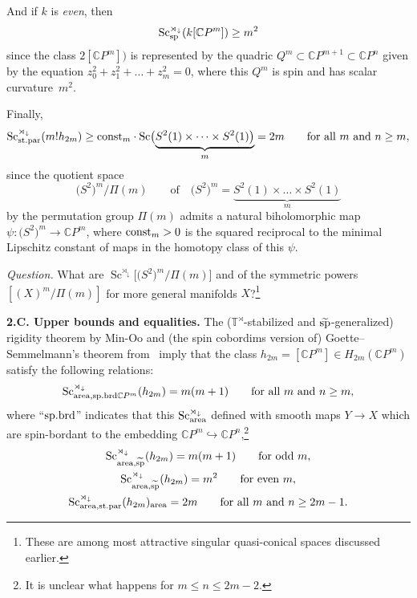 \documentclass[10pt,a4paper]{amsart}
\numberwithin{equation}{section}
\begin{document}
And if $k$ is {\it even}, then
\[
\operatorname{Sc}_{\rm sp}^{\rtimes_\downarrow}(k[\mathbb CP^m])\geq m^2
\]
since the class
$2[\mathbb CP^m])$ is represented by the
 quadric $Q^m\subset \mathbb CP^{m+1}\subset \mathbb CP^n$ given by the equation $z_0^2+z_1^2+\dots +z_m^2=0$,
 where this
$Q^m$ is spin and has scalar curvature~$m^2$.

Finally,
\[
\operatorname{Sc}_{\rm st.par}^{\rtimes_\downarrow}(m!h_{2m}) \geq {\rm const}_m \cdot \operatorname{Sc}\bigl(\underset {m} {\underbrace { S^2(1)\times \dots \times S^2(1)\bigr)}}=2m
\qquad \mbox{for all $m$ and $n\geq m$},
\]
since the quotient space
\[
\bigl(S^2\bigr)^m/\Pi(m) \qquad \text{of} \quad \bigl(S^2\bigr)^m=\underset {m} {\underbrace { S^2(1)\times \dots \times S^2(1)}}
\]
 by the permutation group $\Pi(m)$ admits a natural biholomorphic map $\psi\colon \bigl(S^2\bigr)^m\to \mathbb CP^m$,
 where ${\rm const}_m>0$ is the squared reciprocal to the minimal Lipschitz constant of
 maps in the homotopy class of this $\psi$.

 {\it Question.} What are $\operatorname{Sc}^{\rtimes_\downarrow}\bigl[\bigl(S^2\bigr)^m/\Pi(m)\bigr]$
 and of the symmetric powers $[(X)^m/\Pi(m)]$ for more general manifolds $X$?\footnote{These are among most attractive singular quasi-conical spaces discussed earlier.}

\textbf{2.C. Upper bounds and equalities.} The ($\mathbb T^\rtimes$-stabilized and $\widetilde{\rm sp}$-generalized) rigidity theorem by
Min-Oo \cite{Mi1995} and (the spin cobordims version of) Goette--Semmelmann's theorem from~\cite{GS1999} imply that the
class $h_{2m} =[\mathbb CP^m]\in H_{2m}(\mathbb CP^m)$ satisfy the following relations:
\begin{gather*}
\operatorname{Sc}_{{\rm area,sp.brd}\mathbb C P^m}^{\rtimes_\downarrow} (h_{2m})= m(m+1) \qquad \text{for all $m$ and $n\geq m$}, %
\end{gather*}
 where ``${\rm sp.brd}$'' indicates that this $\operatorname{Sc}_{\rm area}^{\rtimes_\downarrow}$ defined with smooth maps $Y\to X$ which are spin-bordant to the embedding $\mathbb CP^{m}\hookrightarrow \mathbb CP^{n}$,\footnote{It is unclear what happens for $m \leq n\leq 2m-2$.}
\begin{gather*}
\operatorname{Sc}_{{\rm area},\widetilde{\rm sp}}^{\rtimes_\downarrow} (h_{2m})= m(m+1) \qquad \text{for odd $m$},  %
\\
\operatorname{Sc}^{\rtimes_\downarrow} _{{\rm area},\widetilde {\rm sp}}(h_{2m})=m^2 \qquad \text{for even $m$}, %
\\
\operatorname{Sc}^{\rtimes_\downarrow} _{{\rm area,st.par}}(h_{2m})_{\rm area} =2m \qquad \text{for all $m$ and $n\geq 2m-1$}. %
\end{gather*}
\end{document}

